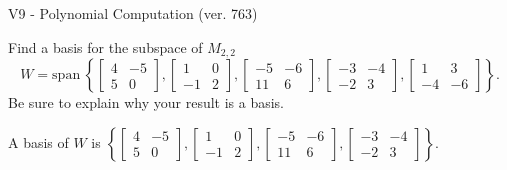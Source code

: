 \begin{exercise}
  \begin{exerciseTitle}V9 - Polynomial Computation (ver. 763)\end{exerciseTitle}
  \begin{exerciseStatement}
    Find a basis for the subspace of \(M_{2,2}\) 
\[W=\mathrm{span}\ \left\{\left[\begin{array}{cc}
4 & -5 \\
5 & 0
\end{array}\right] , \left[\begin{array}{cc}
1 & 0 \\
-1 & 2
\end{array}\right] , \left[\begin{array}{cc}
-5 & -6 \\
11 & 6
\end{array}\right] , \left[\begin{array}{cc}
-3 & -4 \\
-2 & 3
\end{array}\right] , \left[\begin{array}{cc}
1 & 3 \\
-4 & -6
\end{array}\right]\right\}.\]
 Be sure to explain why your result is a basis.


  \end{exerciseStatement}
  \begin{exerciseAnswer}
   A basis of \(W\) is  \(\left\{\left[\begin{array}{cc}
4 & -5 \\
5 & 0
\end{array}\right] , \left[\begin{array}{cc}
1 & 0 \\
-1 & 2
\end{array}\right] , \left[\begin{array}{cc}
-5 & -6 \\
11 & 6
\end{array}\right] , \left[\begin{array}{cc}
-3 & -4 \\
-2 & 3
\end{array}\right]\right\}\).
  


  \end{exerciseAnswer}
\end{exercise}